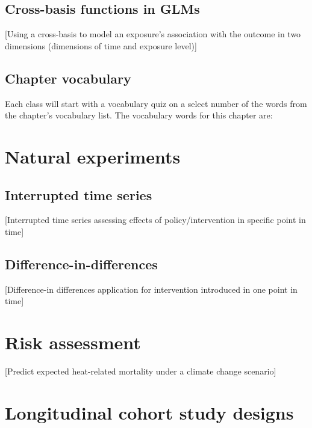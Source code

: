 \documentclass[
]{book}
\begin{document}
\hypertarget{cross-basis-functions-in-glms}{%
\section{Cross-basis functions in GLMs}\label{cross-basis-functions-in-glms}}

{[}Using a cross-basis to model an exposure's association with the
outcome in two dimensions (dimensions of time and exposure level){]}

\hypertarget{chapter-vocabulary-1}{%
\section{Chapter vocabulary}\label{chapter-vocabulary-1}}

Each class will start with a vocabulary quiz on a select number of the words
from the chapter's vocabulary list. The vocabulary words for this chapter are:

\hypertarget{natural-experiments}{%
\chapter{Natural experiments}\label{natural-experiments}}

\hypertarget{interrupted-time-series}{%
\section{Interrupted time series}\label{interrupted-time-series}}

{[}Interrupted time series assessing effects of policy/intervention in specific point in time{]}

\hypertarget{difference-in-differences}{%
\section{Difference-in-differences}\label{difference-in-differences}}

{[}Difference-in differences application for intervention introduced in one point in time{]}

\hypertarget{risk-assessment}{%
\chapter{Risk assessment}\label{risk-assessment}}

{[}Predict expected heat-related mortality under a climate change scenario{]}

\hypertarget{longitudinal-cohort-study-designs}{%
\chapter{Longitudinal cohort study designs}\label{longitudinal-cohort-study-designs}}
\end{document}

